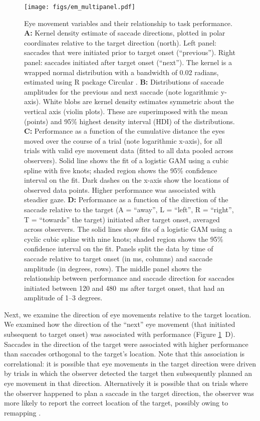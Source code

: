 \documentclass[11pt,a4paper]{article}
\begin{document}
\begin{figure}[H]
\centering
\texttt{[image: figs/em\_multipanel.pdf]}
\caption{
Eye movement variables and their relationship to task performance.
\textbf{A:} Kernel density estimate of saccade directions, plotted in polar coordinates relative to the target direction (north).
Left panel: saccades that were initiated prior to target onset (``previous'').
Right panel: saccades initiated after target onset (``next'').
The kernel is a wrapped normal distribution with a bandwidth of 0.02 radians, estimated using R package Circular \citep{Agostinelli2013}.
\textbf{B:} Distributions of saccade amplitudes for the previous and next saccade (note logarithmic y-axis).
White blobs are kernel density estimates symmetric about the vertical axis (violin plots).
These are superimposed with the mean (points) and 95\% highest density interval (HDI) of the distributions.
\textbf{C:} Performance as a function of the cumulative distance the eyes moved over the course of a trial (note logarithmic x-axis), for all trials with valid eye movement data (fitted to all data pooled across observers).
Solid line shows the fit of a logistic GAM using a cubic spline with five knots; shaded region shows the 95\% confidence interval on the fit.
Dark dashes on the x-axis show the locations of observed data points.
Higher performance was associated with steadier gaze.
\textbf{D:} Performance as a function of the direction of the saccade relative to the target (A = ``away'', L = ``left'', R = ``right'', T = ``towards'' the target) initiated after target onset, averaged across observers.
The solid lines show fits of a logistic GAM using a cyclic cubic spline with nine knots; shaded region shows the 95\% confidence interval on the fit.
Panels split the data by time of saccade relative to target onset (in ms, columns) and saccade amplitude (in degrees, rows).
The middle panel shows the relationship between performance and saccade direction for saccades initiated between 120 and 480~ms after target onset, that had an amplitude of 1--3 degrees.
}
\label{fig:em_multipanel}
\end{figure}

Next, we examine the direction of eye movements relative to the target location. We examined how the direction of the ``next'' eye movement (that initiated subsequent to target onset) was associated with performance (Figure \ref{fig:em_multipanel}~D). Saccades in the direction of the target were associated with higher performance than saccades orthogonal to the target's location. Note that this association is correlational: it is possible that eye movements in the target direction were driven by trials in which the observer detected the target then subsequently planned an eye movement in that direction.
Alternatively it is possible that on trials where the observer happened to plan a saccade in the target direction, the observer was more likely to report the correct location of the target, possibly owing to remapping \citep{Deubel1996}.
\end{document}
